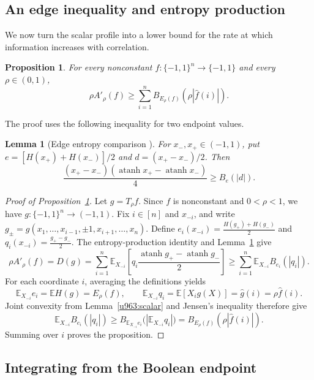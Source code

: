 \documentclass[11pt,letterpaper]{amsart}
\newcommand{\E}{\mathbb E}
\newcommand{\1}{\mathbf 1}
\DeclareMathOperator{\atanh}{atanh}
\newtheorem{lemma}[theorem]{Lemma}
\newtheorem{proposition}[theorem]{Proposition}
\numberwithin{equation}{section}
\begin{document}
\subsection{An edge inequality and entropy production}

We now turn the scalar profile into a lower bound for the rate at
which information increases with correlation.

\begin{proposition}\label{prop:profile-production}
For every nonconstant $f:\{-1,1\}^n\to\{-1,1\}$ and
every $\rho\in(0,1)$,
\[
 \rho A'_\rho(f)\ge
 \sum_{i=1}^n B_{E_\rho(f)}(\rho|\widehat f(i)|).
\]
\end{proposition}

The proof uses the following inequality for two endpoint values.


\begin{lemma}[Edge entropy comparison
{\cite[Lemma~10]{ChenGohariNair2025}}]\label{lem:edge-entropy-profile}
For $x_-,x_+\in(-1,1)$, put
$e=[H(x_+)+H(x_-)]/2$ and $d=(x_+-x_-)/2$.
Then
\[
 \frac{(x_+-x_-)(\atanh x_+-\atanh x_-)}4
 \ge B_e(|d|).
\]
\end{lemma}



\begin{proof}[Proof of Proposition~\ref{prop:profile-production}]
Let $g=T_\rho f$. Since $f$ is nonconstant and $0<\rho<1$,
we have $g:\{-1,1\}^n\to(-1,1)$.
Fix $i\in[n]$ and $x_{-i}$, and write
$g_\pm=g(x_1,\ldots,x_{i-1},\pm1,x_{i+1},\ldots,x_n)$.
Define
$e_i(x_{-i})=\frac{H(g_+)+H(g_-)}2$ and
$q_i(x_{-i})=\frac{g_+-g_-}{2}$.
The entropy-production identity and
Lemma~\ref{lem:edge-entropy-profile} give
\[
 \rho A'_\rho(f)=D(g)=\sum_{i=1}^n\E_{X_{-i}}
   \left[q_i\frac{\atanh g_+-\atanh g_-}{2}\right]\ge\sum_{i=1}^n\E_{X_{-i}}B_{e_i}(|q_i|).
\]
For each coordinate $i$, averaging the definitions yields
\[
 \E_{X_{-i}}e_i=\E H(g)=E_\rho(f),
 \qquad
 \E_{X_{-i}}q_i=\E[X_i g(X)]
              =\widehat g(i)=\rho\widehat f(i).
\]
Joint convexity from Lemma~\ref{u963:scalar} and Jensen's
inequality therefore give
\[
 \E_{X_{-i}}B_{e_i}(|q_i|)
 \ge B_{\E_{X_{-i}}e_i}
       \bigl(|\E_{X_{-i}}q_i|\bigr)
 =B_{E_\rho(f)}(\rho|\widehat f(i)|).
\]
Summing over $i$ proves the proposition.
\end{proof}

\subsection{Integrating from the Boolean endpoint}
\end{document}
